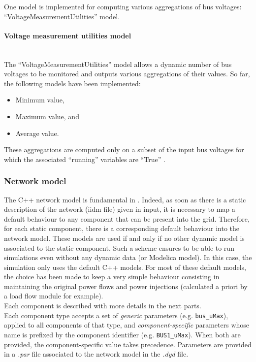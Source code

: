 \documentclass[a4paper, 12pt]{report}
\begin{document}
One model is implemented for computing various aggregations of bus voltages: ``VoltageMeasurementUtilities''  model.

\paragraph{Voltage measurement utilities model}
~~\\

The ``VoltageMeasurementUtilities'' model allows a dynamic number of bus voltages to be monitored and outputs various aggregations of their values.
So far, the following models have been implemented:
\begin{itemize}
\item Minimum value,
\item Maximum value, and
\item Average value.
\end{itemize}

These aggregations are computed only on a subset of the input bus voltages for which the associated ``running''  variables are ``True'' .

\subsubsection{Network model}
\label{Network}

The C++ network model is fundamental in \Dynawo. Indeed, as soon as there is a static description of the network (iidm file) given in input, it is necessary to map a default behaviour to any component that can be present into the grid. Therefore, for each static component, there is a corresponding default behaviour into the network model. These models are used if and only if no other dynamic model is associated to the static component. Such a scheme ensures to be able to run simulations even without any dynamic data (or Modelica model). In this case, the simulation only uses the default C++ models. For most of these default models, the choice has been made to keep a very simple behaviour consisting in maintaining the original power flows and power injections (calculated a priori by a load flow module for example). \\
Each component is described with more details in the next parts. \\

Each component type accepts a set of \textit{generic} parameters (e.g. \texttt{bus\_uMax}), applied to all components of that type, and \textit{component-specific} parameters whose name is prefixed by the component identifier (e.g. \texttt{BUS1\_uMax}). When both are provided, the component-specific value takes precedence. Parameters are provided in a \textit{.par} file associated to the network model in the \textit{.dyd} file. \\
\end{document}
